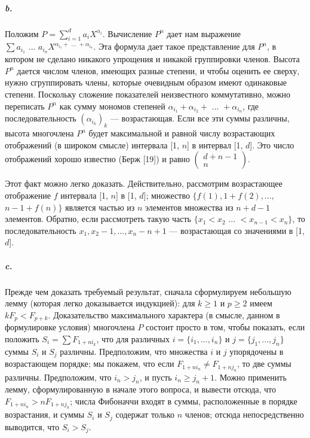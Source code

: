 \documentclass{../../template/mai_book}
\begin{document}
\subparagraph{b.} Положим $P = {\sum}_{i = 1}^d a_i X^{\alpha_i}$. Вычисление $P^n$ дает нам выражение \linebreak $\sum a_{i_1} \text{ ... } a_{i_n}X^{\alpha_{i_1} + \text{ ... } + \alpha_{i_n}}$. Эта формула дает такое представление для $P^n$, в котором не сделано никакого упрощения и никакой группировки членов. Высота $P^n$ дается числом членов, имеющих разные степени, и чтобы оценить ее сверху, нужно сгруппировать члены, которые очевидным образом имеют одинаковые степени. Поскольку сложение показателей неизвестного коммутативно, можно переписать $P^n$ как сумму мономов степеней $\alpha_{i_1} + \alpha_{i_2} + \text{ ... } + \alpha_{i_n}$, где последовательность $(\alpha_{i_k})_k$ — возрастающая. Если все эти суммы различны, высота многочлена $P^n$ будет максимальной и равной числу возрастающих отображений (в широком смысле) интервала [1, $n$] в интервал [1, $d$]. Это число отображений хорошо известно (Берж [19]) и равно $\left(\begin{array}{c} d + n - 1 \\ n \end{array}\right)$.

Этот факт можно легко доказать. Действительно, рассмотрим возрастающее отображение $f$ интервала [1, $n$] в [1, $d$]; множество $\{f(1), 1 + f(2),...,$ \linebreak $n - 1 + f(n)\}$ является частью из $n$ элементов множества из $n + d - 1$ элементов. Обратно, если рассмотреть такую часть $\{x_1 < x_2 \text{ ... } < x_{n - 1} < x_n\}$, то последовательность $x_1, x_2 - 1,...,x_n - n + 1$ — возрастающая со значениями \linebreak в [1, $d$].

\subparagraph{c.} Прежде чем доказать требуемый результат, сначала сформулируем небольшую лемму (которая легко доказывается индукцией): для $k \geqslant 1$ и $p \geqslant 2$ имеем $kF_p < F_{p + k}$. Доказательство максимального характера (в смысле, данном в формулировке условия) многочлена $P$ состоит просто в том, чтобы показать, если положить $S_i = \sum F_{1 + ni_k}$, что для различных $i = \{i_1,...,i_n\}$ и $j = \{j_1,...,j_n\}$ суммы $S_i$ и $S_j$ различны. Предположим, что множества $i$ и $j$ упорядочены в возрастающем порядке; мы покажем, что если $F_{1 + ni_n} \neq F_{1 + nj_n}$, то две суммы различны. Предположим, что $i_n > j_n$, и пусть $i_n \geqslant j_n + 1$. Можно применить лемму, сформулированную в начале этого вопроса, и вывести отсюда, что $F_{1 + ni_n} > nF_{1 + nj_n}$; числа Фибоначчи входят в суммы, расположенные в порядке возрастания, и суммы $S_i$ и $S_j$ содержат только $n$ членов; отсюда непосредственно выводится, что $S_i > S_j$.
\end{document}
